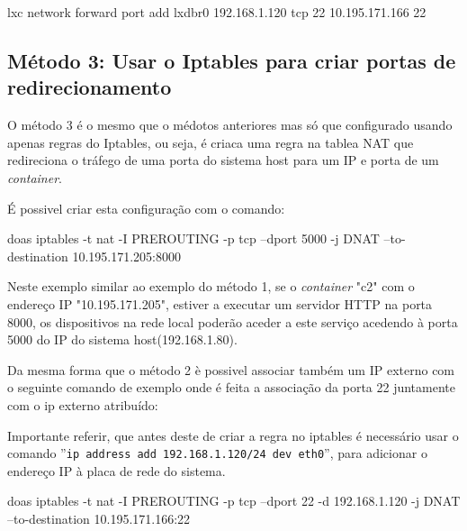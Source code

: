 \begin{tcolorbox}[colback=blue!5!white,colframe=blue!75!black]
    lxc network forward port add lxdbr0 192.168.1.120 tcp 22 10.195.171.166 22
\end{tcolorbox}

\subsection{Método 3: Usar o Iptables para criar portas de redirecionamento}

O método 3 é o mesmo que o médotos anteriores mas só que configurado usando apenas regras
do Iptables, ou seja, é criaca uma regra na tablea NAT que redireciona o tráfego
de uma porta do sistema host para um IP e porta de um \textit{container}.

É possivel criar esta configuração com o comando:




\begin{tcolorbox}[colback=blue!5!white,colframe=blue!75!black]
    doas iptables -t nat -I PREROUTING -p tcp --dport 5000 -j DNAT --to-destination 10.195.171.205:8000
\end{tcolorbox}

Neste exemplo similar ao exemplo do método 1, se o \textit{container} "c2" com o 
endereço IP "10.195.171.205", estiver a executar um servidor HTTP na porta
8000, os dispositivos na rede local poderão aceder a este serviço acedendo à porta 
5000 do IP do sistema host(192.168.1.80).


Da mesma forma que o método 2 è possivel associar também um IP externo com o seguinte comando de exemplo
onde é feita a associação da porta 22 juntamente com o ip externo atribuído:

Importante referir, que antes deste de criar a regra no iptables é necessário usar o
comando ”\texttt{ip address add 192.168.1.120/24 dev eth0}”, para adicionar o endereço IP
à placa de rede do sistema.

\begin{tcolorbox}[colback=blue!5!white,colframe=blue!75!black]
    doas iptables -t nat -I PREROUTING -p tcp --dport 22 -d 192.168.1.120 -j DNAT --to-destination 10.195.171.166:22
\end{tcolorbox}



